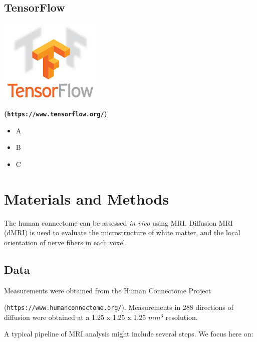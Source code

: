 \documentclass[a0,landscape]{a0poster}
\begin{document}
\begin{multicols}{3}
\begin{minipage}[b]{0.75\linewidth}
  \subsection*{TensorFlow}
\end{minipage}
\begin{minipage}[b]{0.25\linewidth}
  \includegraphics[height=4cm]{tensor-flow-logo.png}
\end{minipage}

\textbf{(\texttt{https://www.tensorflow.org/})}
\begin{itemize}
  \item A
  \item B
  \item C
\end{itemize}

\normalsize
\section*{Materials and Methods}
The human connectome can be assessed \emph{in vivo} using MRI. Diffusion MRI
(dMRI) is used to evaluate the microstructure of white matter, and the local orientation of nerve fibers in each voxel.

\subsection*{Data}

Measurements were obtained from the Human Connectome Project

(\texttt{https://www.humanconnectome.org/}). Measurements in 288 directions of diffusion were obtained at a 1.25 x 1.25 x 1.25 $mm^3$ resolution.

A typical pipeline of MRI analysis might include several steps. We focus here on:
\begin{itemize}


\end{itemize}
\end{multicols}
\end{document}
